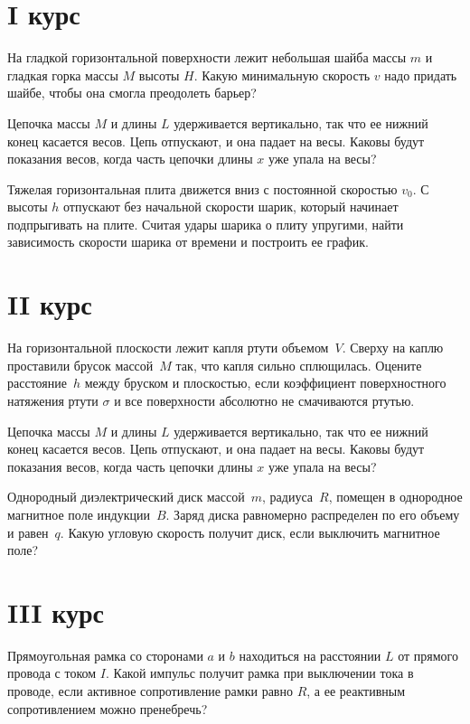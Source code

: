 \section{I курс}

\AddProb На гладкой горизонтальной поверхности лежит небольшая шайба массы $m$ и гладкая 
горка массы $M$ высоты $H$. Какую минимальную скорость $v$ надо придать шайбе, чтобы она 
смогла преодолеть барьер?

\AddProb Цепочка массы $M$ и длины $L$ удерживается вертикально, так что ее нижний конец 
касается весов. Цепь отпускают, и она падает на весы. Каковы будут показания весов, когда 
часть цепочки длины $x$ уже упала на весы?

\AddProb Тяжелая горизонтальная плита движется вниз с постоянной скоростью $v_0$. С высоты $h$ 
отпускают без начальной скорости шарик, который начинает подпрыгивать на плите. Считая 
удары шарика о плиту упругими, найти зависимость скорости шарика от времени и построить 
ее график.


\section{II курс}

\AddProb На горизонтальной плоскости лежит капля ртути объемом~$V$. Сверху на 
каплю проставили брусок массой~$M$ так, что капля сильно сплющилась. Оцените 
расстояние~$h$ между бруском и плоскостью, если коэффициент поверхностного 
натяжения ртути $\sigma$ и все поверхности абсолютно не смачиваются ртутью.

\AddProb Цепочка массы $M$ и длины $L$ удерживается вертикально, так что ее нижний конец 
касается весов. Цепь отпускают, и она падает на весы. Каковы будут показания весов, когда 
часть цепочки длины $x$ уже упала на весы?

\AddProb Однородный диэлектрический диск массой~$m$, радиуса~$R$, помещен в однородное магнитное поле индукции~$B$. 
Заряд диска равномерно распределен по его объему и равен~$q$. 
Какую угловую скорость получит диск, если выключить магнитное поле?


\section{III курс}

\AddProb Прямоугольная рамка со сторонами $a$ и $b$ находиться на расстоянии $L$ от 
прямого провода с током $I$. Какой импульс получит рамка при выключении тока в 
проводе, если активное сопротивление рамки равно $R$, а ее реактивным 
сопротивлением можно пренебречь?

